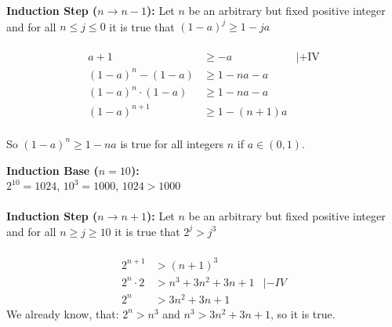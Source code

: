 \textbf{Induction Step ($n \rightarrow n-1$):} Let $n$ be an arbitrary but fixed positive integer and for all $n \leq j \leq 0$ it is true that $(1-a)^j \geq 1-ja$ \\ \\

\begin{align*}
    a+1                   & \geq -a       & | + \text{IV} \\
    (1-a)^{n} - (1-a)     & \geq 1-na-a                   \\
    (1-a)^{n} \cdot (1-a) & \geq 1-na-a                   \\
    (1-a)^{n+1}           & \geq 1-(n+1)a                 \\
\end{align*}


So $(1-a)^n \geq 1-na$ is true for all integers $n$ if $a \in (0,1)$.

\textbf{Induction Base ($n=10$):} \\
$2^10 = 1024$, $10^3 = 1000$, $1024 > 1000$ \\ \\

\textbf{Induction Step ($n \rightarrow n+1$):} Let $n$ be an arbitrary but fixed positive integer and for all $n \geq j \geq 10$ it is true that $2^j > j^3$ \\ \\
\begin{align*}
    2^{n+1}     & > (n+1)^3                   \\
    2^n \cdot 2 & > n^3+ 3n^2 + 3n +1 & |- IV \\
    2^n         & > 3n^2 +3n + 1
\end{align*}
We already know, that: $2^n > n^3$ and $n^3 > 3n^2 +3n+1$, so it is true.

    \tasktodo


